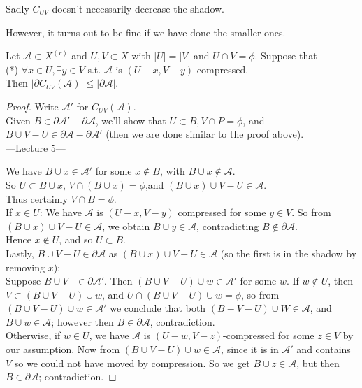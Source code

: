 \documentclass[a4paper]{article}
\begin{document}
Sadly $C_{UV}$ doesn't necessarily decrease the shadow.

However, it turns out to be fine if we have done the smaller ones.

\begin{prop}
    Let $\mathcal{A} \subset X^{(r)}$ and $U,V \subset X$ with $|U|=|V|$ and $U \cap V = \phi$. Suppose that\\
    (*) $\forall x \in U, \exists y \in V$ s.t. $\mathcal{A}$ is $(U-x,V-y)$-compressed.\\
    Then $|\partial C_{UV}(\mathcal{A})|\leq |\partial \mathcal{A}|$.
    \begin{proof}
        Write $\mathcal{A}'$ for $C_{UV}(\mathcal{A})$.\\
        Given $B \in \partial \mathcal{A}' - \partial \mathcal{A}$, we'll show that $U \subset B, V \cap P = \phi$, and $B \cup V - U \in \partial \mathcal{A} - \partial \mathcal{A}'$ (then we are done similar to the proof above).\\

---Lecture 5---

        We have $B \cup x \in \mathcal{A}'$ for some $x \not\in B$, with $B \cup x \not\in \mathcal{A}$.\\
        So $U \subset B \cup x$, $V \cap (B \cup x) = \phi$,and $(B \cup x) \cup V - U \in \mathcal{A}$.\\
        Thus certainly $V \cap B = \phi$.\\
        If $x \in U$: We have $\mathcal{A}$ is $(U-x,V-y)$ compressed for some $y \in V$. So from $(B \cup x) \cup V - U \in \mathcal{A}$, we obtain $B \cup y \in \mathcal{A}$, contradicting $B \not\in \partial \mathcal{A}$.\\
        Hence $x \not\in U$, and so $U \subset B$.\\
        Lastly, $B \cup V - U \in \partial \mathcal{A}$ as $(B \cup x) \cup V - U \in \mathcal{A}$ (so the first is in the shadow by removing $x$);\\
        Suppose $B \cup V- \in \partial \mathcal{A}'$. Then $(B \cup V - U) \cup w \in \mathcal{A}'$ for some $w$. If $w \not\in U$, then $V \subset (B \cup V - U) \cup w$, and $U \cap (B\cup V-U) \cup w = \phi$, so from $(B\cup V - U) \cup w \in \mathcal{A}'$ we conclude that both $(B-V-U) \cup W \in \mathcal{A}$, and $B \cup w \in \mathcal{A}$; however then $B \in \partial \mathcal{A}$, contradiction.\\
        Otherwise, if $w \in U$, we have $\mathcal{A}$ is $(U-w,V-z)$-compressed for some $z \in V$ by our assumption. Now from $(B \cup V-U) \cup w \in\mathcal{A}$, since it is in $\mathcal{A}'$ and contains $V$ so we could not have moved by compression. So we get $B \cup z \in \mathcal{A}$, but then $B \in \partial \mathcal{A}$; contradiction.
    \end{proof}
\end{prop}
\end{document}
